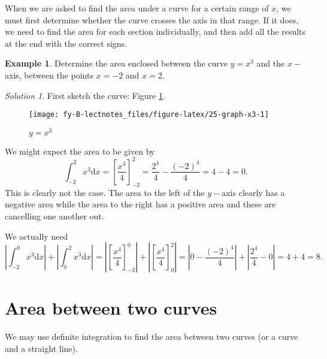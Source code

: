 \documentclass[
  11pt,
  oneside]{book}
\newcommand{\slide}{}
\theoremstyle{definition}
\theoremstyle{definition}
\newtheorem{example}{Example}[chapter]
\theoremstyle{definition}
\theoremstyle{definition}
\theoremstyle{remark}
\newtheorem*{solution}{Solution}
\begin{document}
\slide

When we are asked to find the area under a curve for a certain range of \(x\), we must first determine whether the curve crosses the axis in that range. If it does, we need to find the area for each section individually, and then add all the results at the end with the correct signs.

\slide

\begin{example}
Determine the area enclosed between the curve \(y=x^3\) and the \(x-\)axis, between the points \(x=-2\) and \(x=2\).
\end{example}

\begin{solution}
First sketch the curve: Figure \ref{fig:25-graph-x3}.

\begin{figure}

{\centering \texttt{[image: fy-B-lectnotes\_files/figure-latex/25-graph-x3-1]} 

}

\caption{$y=x^3$}\label{fig:25-graph-x3}
\end{figure}

We might expect the area to be given by
\[
\int_{-2}^2x^3\mathrm{d}x = \left[\frac{x^4}4\right]_{-2}^2 = \frac{2^4}4-\frac{(-2)^4}4 = 4-4 = 0.
\]
This is clearly not the case. The area to the left of the \(y-\)axis clearly has a negative area while the area to the right has a positive area and these are cancelling one another out.

We actually need
\[
\left|\int_{-2}^0x^3\mathrm{d}x\right|+\left|\int_0^2x^3\mathrm{d}x\right| = \left|\left[\frac{x^4}4\right]_{-2}^0\right|+\left|\left[\frac{x^4}4\right]_{0}^2\right| = \left|0-\frac{(-2)^4}4\right|+\left|\frac{2^4}4-0\right| = 4+4=8.
\]
\end{solution}

\slide

\begin{slidesonly}

\hbox{}
\slide

\end{slidesonly}

\section{Area between two curves}\label{area-between-two-curves}

We may use definite integration to find the area between two curves (or a curve and a straight line).
\end{document}
